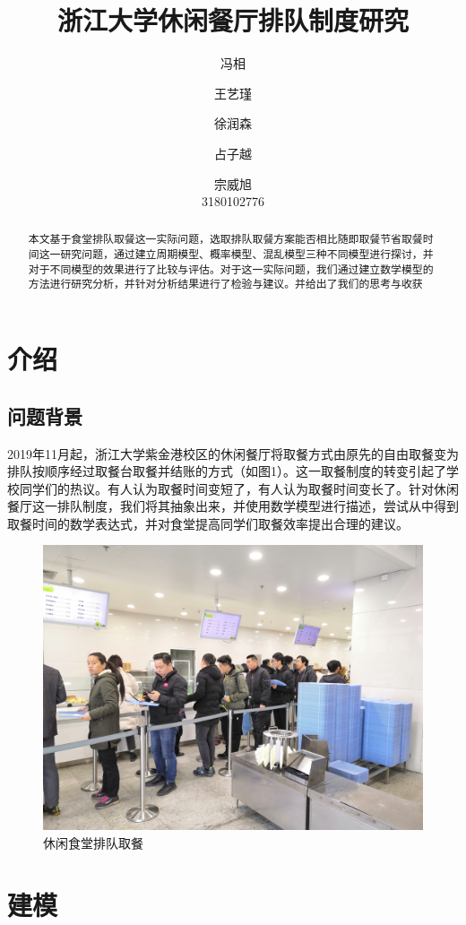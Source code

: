 \documentclass[lang=cn,10pt,a4paper]{elegantpaper}
\title{浙江大学休闲餐厅排队制度研究}
\author{冯相 \and 王艺瑾 \and 徐润森 \and 占子越 \and 宗威旭 \\3180102776}
\institute{浙江大学}
\date{\zhtoday}
\begin{document}
\maketitle

\begin{abstract}
本文基于食堂排队取餐这一实际问题，选取排队取餐方案能否相比随即取餐节省取餐时间这一研究问题，通过建立周期模型、概率模型、混乱模型三种不同模型进行探讨，并对于不同模型的效果进行了比较与评估。对于这一实际问题，我们通过建立数学模型的方法进行研究分析，并针对分析结果进行了检验与建议。并给出了我们的思考与收获
\end{abstract}

\section{介绍}
\subsection{问题背景}
2019年11月起，浙江大学紫金港校区的休闲餐厅将取餐方式由原先的自由取餐变为排队按顺序经过取餐台取餐并结账的方式（如图1）。这一取餐制度的转变引起了学校同学们的热议。有人认为取餐时间变短了，有人认为取餐时间变长了。针对休闲餐厅这一排队制度，我们将其抽象出来，并使用数学模型进行描述，尝试从中得到取餐时间的数学表达式，并对食堂提高同学们取餐效率提出合理的建议。\\
\begin{figure}[htbp]
  \centering
  \includegraphics[scale=0.07]{./image/pic1.jpg}
  \caption{休闲食堂排队取餐}
\end{figure}
\section{建模}
\end{document}
